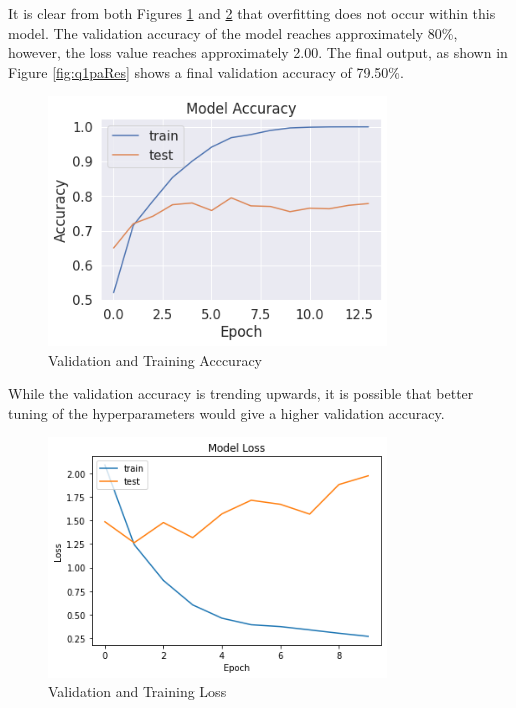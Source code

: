 It is clear from both Figures \ref{fig:q1paAcc} and \ref{fig:q1paLoss} that
overfitting does not occur within this model. The validation accuracy of the
model reaches approximately 80\%, however, the loss value reaches approximately
2.00. The final output, as shown in Figure \ref{fig:q1paRes} shows a final
validation accuracy of 79.50\%.

\begin{figure}[H]
	\centering
	\includegraphics[width=0.8\textwidth]{images/q1/pa/accuracy}
	\caption{Validation and Training Acccuracy}
	\label{fig:q1paAcc}
\end{figure}

While the validation accuracy is trending upwards, it is possible that better
tuning of the hyperparameters would give a higher validation accuracy.

\begin{figure}[H]
	\centering
	\includegraphics[width=0.8\textwidth]{images/q1/pa/loss}
	\caption{Validation and Training Loss}
	\label{fig:q1paLoss}
\end{figure}

